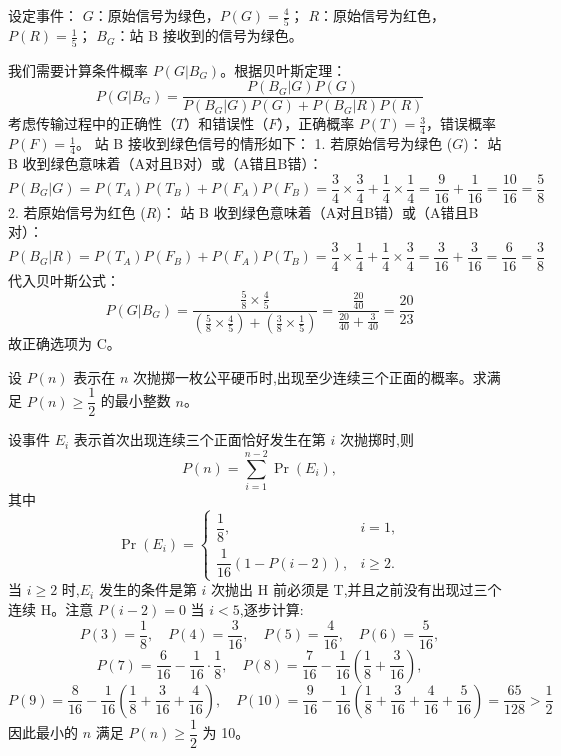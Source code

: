 \begin{questions}
\begin{solution}
设定事件：
$G$：原始信号为绿色，$P(G) = \frac{4}{5}$；
$R$：原始信号为红色，$P(R) = \frac{1}{5}$；
$B_G$：站 B 接收到的信号为绿色。

我们需要计算条件概率 $P(G | B_G)$。根据贝叶斯定理：
\[
P(G | B_G) = \frac{P(B_G | G) P(G)}{P(B_G | G) P(G) + P(B_G | R) P(R)}
\]
考虑传输过程中的正确性（$T$）和错误性（$F$），正确概率 $P(T) = \frac{3}{4}$，错误概率 $P(F) = \frac{1}{4}$。
站 B 接收到绿色信号的情形如下：
1. 若原始信号为绿色 ($G$)：
站 B 收到绿色意味着（A对且B对）或（A错且B错）：
\[
P(B_G | G) = P(T_A)P(T_B) + P(F_A)P(F_B) = \frac{3}{4} \times \frac{3}{4} + \frac{1}{4} \times \frac{1}{4} = \frac{9}{16} + \frac{1}{16} = \frac{10}{16} = \frac{5}{8}
\]
2. 若原始信号为红色 ($R$)：
站 B 收到绿色意味着（A对且B错）或（A错且B对）：
\[
P(B_G | R) = P(T_A)P(F_B) + P(F_A)P(T_B) = \frac{3}{4} \times \frac{1}{4} + \frac{1}{4} \times \frac{3}{4} = \frac{3}{16} + \frac{3}{16} = \frac{6}{16} = \frac{3}{8}
\]
代入贝叶斯公式：
\[
P(G | B_G) = \frac{\frac{5}{8} \times \frac{4}{5}}{\left(\frac{5}{8} \times \frac{4}{5}\right) + \left(\frac{3}{8} \times \frac{1}{5}\right)} = \frac{\frac{20}{40}}{\frac{20}{40} + \frac{3}{40}} = \frac{20}{23}
\]
故正确选项为 C。
\end{solution}

    \question 设 $P(n)$ 表示在 $n$ 次抛掷一枚公平硬币时,出现至少连续三个正面的概率。求满足 $P(n)\ge \dfrac12$ 的最小整数 $n$。
    \begin{solution}
        设事件 $E_i$ 表示首次出现连续三个正面恰好发生在第 $i$ 次抛掷时,则
        \[
        P(n) = \sum_{i=1}^{n-2} \Pr(E_i),
        \]
        其中
        \[
        \Pr(E_i) = 
        \begin{cases}
        \dfrac{1}{8}, & i=1,\\[2mm]
        \dfrac{1}{16}(1-P(i-2)), & i\ge 2.
        \end{cases}
        \]
        当 $i\ge 2$ 时,$E_i$ 发生的条件是第 $i$ 次抛出 H 前必须是 T,并且之前没有出现过三个连续 H。注意 $P(i-2)=0$ 当 $i<5$,逐步计算:
        \[
        P(3)=\frac{1}{8},\quad P(4)=\frac{3}{16},\quad P(5)=\frac{4}{16},\quad P(6)=\frac{5}{16},
        \]
        \[
        P(7)=\frac{6}{16}-\frac{1}{16}\cdot\frac{1}{8},\quad P(8)=\frac{7}{16}-\frac{1}{16}\left(\frac{1}{8}+\frac{3}{16}\right),
        \]
        \[
        P(9)=\frac{8}{16}-\frac{1}{16}\left(\frac{1}{8}+\frac{3}{16}+\frac{4}{16}\right),\quad 
        P(10)=\frac{9}{16}-\frac{1}{16}\left(\frac{1}{8}+\frac{3}{16}+\frac{4}{16}+\frac{5}{16}\right)=\frac{65}{128} > \frac{1}{2}
        \]
        因此最小的 $n$ 满足 $P(n)\ge \dfrac{1}{2}$ 为 10。
    \end{solution}


\end{questions}
